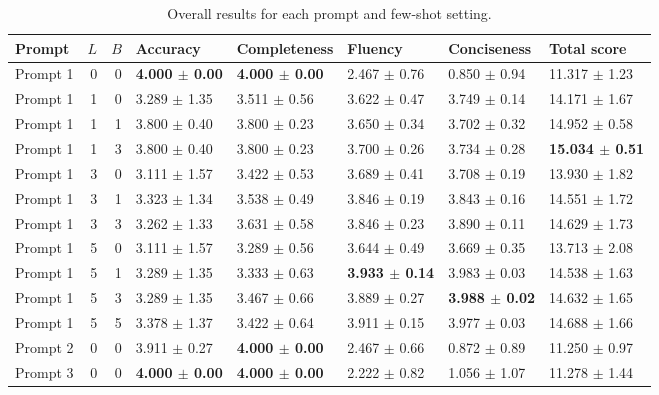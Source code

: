 \begin{table}
\caption{Overall results for each prompt and few-shot setting.}
\begin{tabular}{lrrlllll}
\toprule
Prompt & $L$ & $B$ & Accuracy & Completeness & Fluency & Conciseness & Total score \\
\midrule
Prompt 1 & 0 & 0 & \textbf{4.000 $\pm$ 0.00} & \textbf{4.000 $\pm$ 0.00} & 2.467 $\pm$ 0.76 & 0.850 $\pm$ 0.94 & 11.317 $\pm$ 1.23 \\
Prompt 1 & 1 & 0 & 3.289 $\pm$ 1.35 & 3.511 $\pm$ 0.56 & 3.622 $\pm$ 0.47 & 3.749 $\pm$ 0.14 & 14.171 $\pm$ 1.67 \\
Prompt 1 & 1 & 1 & 3.800 $\pm$ 0.40 & 3.800 $\pm$ 0.23 & 3.650 $\pm$ 0.34 & 3.702 $\pm$ 0.32 & 14.952 $\pm$ 0.58 \\
Prompt 1 & 1 & 3 & 3.800 $\pm$ 0.40 & 3.800 $\pm$ 0.23 & 3.700 $\pm$ 0.26 & 3.734 $\pm$ 0.28 & \textbf{15.034 $\pm$ 0.51} \\
Prompt 1 & 3 & 0 & 3.111 $\pm$ 1.57 & 3.422 $\pm$ 0.53 & 3.689 $\pm$ 0.41 & 3.708 $\pm$ 0.19 & 13.930 $\pm$ 1.82 \\
Prompt 1 & 3 & 1 & 3.323 $\pm$ 1.34 & 3.538 $\pm$ 0.49 & 3.846 $\pm$ 0.19 & 3.843 $\pm$ 0.16 & 14.551 $\pm$ 1.72 \\
Prompt 1 & 3 & 3 & 3.262 $\pm$ 1.33 & 3.631 $\pm$ 0.58 & 3.846 $\pm$ 0.23 & 3.890 $\pm$ 0.11 & 14.629 $\pm$ 1.73 \\
Prompt 1 & 5 & 0 & 3.111 $\pm$ 1.57 & 3.289 $\pm$ 0.56 & 3.644 $\pm$ 0.49 & 3.669 $\pm$ 0.35 & 13.713 $\pm$ 2.08 \\
Prompt 1 & 5 & 1 & 3.289 $\pm$ 1.35 & 3.333 $\pm$ 0.63 & \textbf{3.933 $\pm$ 0.14} & 3.983 $\pm$ 0.03 & 14.538 $\pm$ 1.63 \\
Prompt 1 & 5 & 3 & 3.289 $\pm$ 1.35 & 3.467 $\pm$ 0.66 & 3.889 $\pm$ 0.27 & \textbf{3.988 $\pm$ 0.02} & 14.632 $\pm$ 1.65 \\
Prompt 1 & 5 & 5 & 3.378 $\pm$ 1.37 & 3.422 $\pm$ 0.64 & 3.911 $\pm$ 0.15 & 3.977 $\pm$ 0.03 & 14.688 $\pm$ 1.66 \\
Prompt 2 & 0 & 0 & 3.911 $\pm$ 0.27 & \textbf{4.000 $\pm$ 0.00} & 2.467 $\pm$ 0.66 & 0.872 $\pm$ 0.89 & 11.250 $\pm$ 0.97 \\
Prompt 3 & 0 & 0 & \textbf{4.000 $\pm$ 0.00} & \textbf{4.000 $\pm$ 0.00} & 2.222 $\pm$ 0.82 & 1.056 $\pm$ 1.07 & 11.278 $\pm$ 1.44 \\
\bottomrule
\end{tabular}
\end{table}
